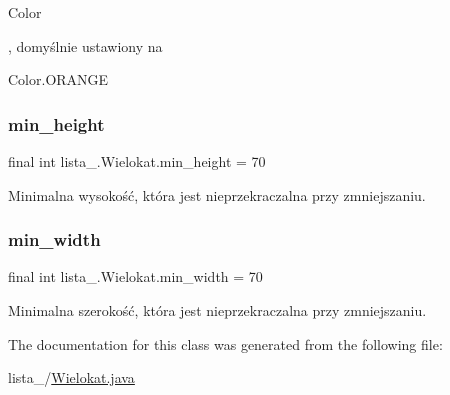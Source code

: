 \begin{DoxyCode}
Color 
\end{DoxyCode}
 , domyślnie ustawiony na
\begin{DoxyCode}
Color.ORANGE 
\end{DoxyCode}
 \mbox{\label{classlista__5_1_1_wielokat_a0aa7a67f7c10f26e3bf9f4444e5ecb65}} 
\subsubsection{\texorpdfstring{min\+\_\+height}{min\_height}}
{\footnotesize\ttfamily final int lista\+\_.\+Wielokat.\+min\+\_\+height = 70\hspace{0.3cm}{\ttfamily [private]}}

Minimalna wysokość, która jest nieprzekraczalna przy zmniejszaniu. \mbox{\label{classlista__5_1_1_wielokat_a362cfa49edf4875e534bb1f95a59e7af}} 
\subsubsection{\texorpdfstring{min\+\_\+width}{min\_width}}
{\footnotesize\ttfamily final int lista\+\_.\+Wielokat.\+min\+\_\+width = 70\hspace{0.3cm}{\ttfamily [private]}}

Minimalna szerokość, która jest nieprzekraczalna przy zmniejszaniu. 

The documentation for this class was generated from the following file\+:\begin{DoxyCompactItemize}
\item 
lista\+\_/\mbox{\hyperlink{_wielokat_8java}{Wielokat.\+java}}\end{DoxyCompactItemize}
